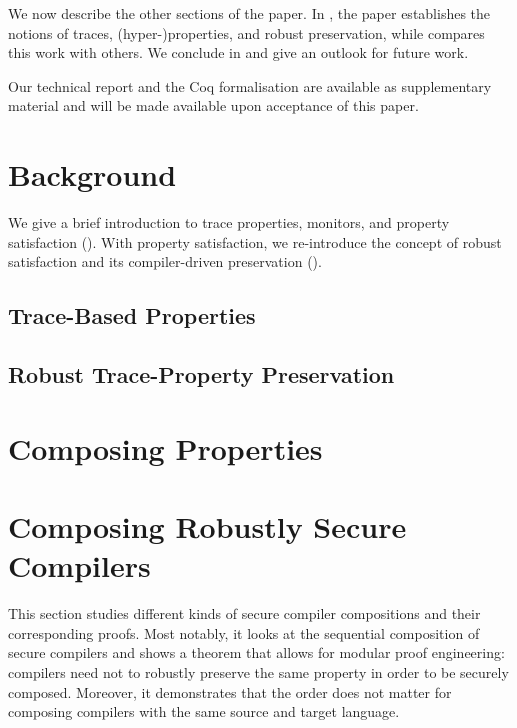 \documentclass[acmsmall,review,screen,dvipsnames]{acmart}
\begin{document}
We now describe the other sections of the paper.
In , the paper establishes the notions of traces, (hyper-)properties, and robust preservation, while  compares this work with others.
We conclude in  and give an outlook for future work.

 Our technical report and the Coq formalisation are
available as supplementary material and will be made available upon acceptance of this paper.


\section{Background}\label{sec:background}
We give a brief introduction to trace properties, monitors, and property satisfaction ().
With property satisfaction, we re-introduce the concept of robust satisfaction and its compiler-driven preservation ().

\subsection{Trace-Based Properties}\label{subsec:bg:tprop}
\subsection{Robust Trace-Property Preservation}\label{subsec:bg:rtp}

\section{Composing Properties}\label{sec:compprop}
\section{Composing Robustly Secure Compilers}\label{sec:compcomp}
This section studies different kinds of secure compiler compositions and their corresponding proofs.
Most notably, it looks at the sequential composition of secure compilers and shows a theorem that allows for modular proof engineering: compilers need not to robustly preserve the same property in order to be securely composed.
Moreover, it demonstrates that the order does not matter for composing compilers with the same source and target language.
\end{document}
